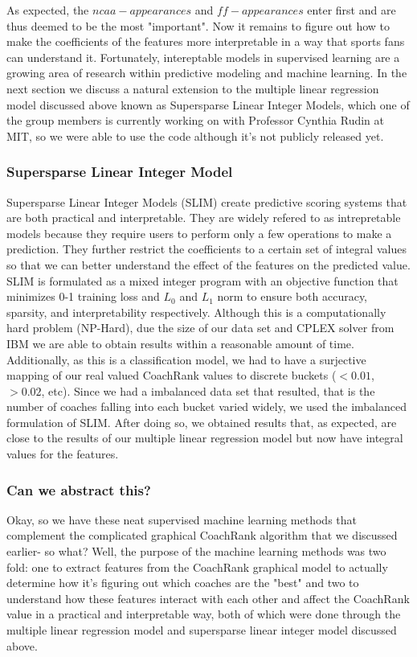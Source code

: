\documentclass[11pt,notitlepage]{article}
\begin{document}
\noindent As expected, the $ncaa-appearances$ and $ff-appearances$ enter first and are thus deemed to be the most "important". Now it remains to figure out how to make the coefficients of the features more interpretable in a way that sports fans can understand it. Fortunately, intereptable models in supervised learning are a growing area of research within predictive modeling and machine learning. In the next section we discuss a natural extension to the multiple linear regression model discussed above known as Supersparse Linear Integer Models, which one of the group members is currently working on with Professor Cynthia Rudin at MIT, so we were able to use the code although it's not publicly released yet.

\subsubsection*{Supersparse Linear Integer Model}

Supersparse Linear Integer Models (SLIM) create predictive scoring systems that are both practical and interpretable. They are widely refered to as intrepretable models because they require users to perform only a few operations to make a prediction. They further restrict the coefficients to a certain set of integral values so that we can better understand the effect of the features on the predicted value. SLIM is formulated as a mixed integer program with an objective function that minimizes 0-1 training loss and $L_0$ and $L_1$ norm to ensure both accuracy, sparsity, and interpretability respectively. Although this is a computationally hard problem (NP-Hard), due the size of our data set and CPLEX solver from IBM we are able to obtain results within a reasonable amount of time. Additionally, as this is a classification model, we had to have a surjective mapping of our real valued CoachRank values to discrete buckets ($<0.01$, $>0.02$, etc). Since we had a imbalanced data set that resulted, that is the number of coaches falling into each bucket varied widely, we used the imbalanced formulation of SLIM. After doing so, we obtained results that, as expected, are close to the results of our multiple linear regression model but now have integral values for the features.        

\subsubsection*{Can we abstract this?}

\noindent Okay, so we have these neat supervised machine learning methods that complement the complicated graphical CoachRank algorithm that we discussed earlier- so what? Well, the purpose of the machine learning methods was two fold: one to extract features from the CoachRank graphical model to actually determine how it's figuring out which coaches are the "best" and two to understand how these features interact with each other and affect the CoachRank value in a practical and interpretable way, both of which were done through the multiple linear regression model and supersparse linear integer model discussed above.  
\end{document}
